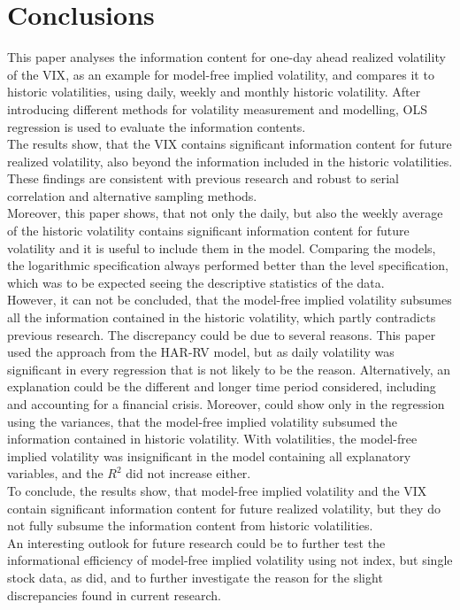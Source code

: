 
\section{Conclusions}\label{sec:6Discussion}
This paper analyses the information content for one-day ahead realized volatility of the \ac{VIX}, as an example for model-free implied volatility, and compares it to historic volatilities, using daily, weekly and monthly historic volatility. After introducing different methods for volatility measurement and modelling, OLS regression is used to evaluate the information contents. \\
The results show, that the \ac{VIX} contains significant information content for future realized volatility, also beyond the information included in the historic volatilities. These findings are consistent with previous research and robust to serial correlation and alternative sampling methods. \\
Moreover, this paper shows, that not only the daily, but also the weekly average of the  historic volatility contains significant information content for future volatility and it is useful to include them in the model. Comparing the models, the logarithmic specification always performed better than the level specification, which was to be expected seeing the descriptive statistics of the data. \\
However, it can not be concluded, that the model-free implied volatility subsumes all the information contained in the historic volatility, which partly contradicts previous research. The discrepancy could be due to several reasons. This paper used the approach from the HAR-RV model, but as daily volatility was significant in every regression that is not likely to be the reason. Alternatively, an explanation could be the different and longer time period considered, including and accounting for a financial crisis. Moreover, \textcite{jiang2003} could show only in the regression using the variances, that the model-free implied volatility subsumed the information contained in historic volatility. With volatilities, the model-free implied volatility was insignificant in the model containing all explanatory variables, and the $R^{2}$ did not increase either.\\
To conclude, the results show, that model-free implied volatility and the VIX contain significant information content for future realized volatility, but they do not fully subsume the information content from historic volatilities.\\
An interesting outlook for future research could be to further test the informational efficiency of model-free implied volatility using not index, but single stock data, as \textcite{taylor2010} did, and to further investigate the reason for the slight discrepancies found in current research.

